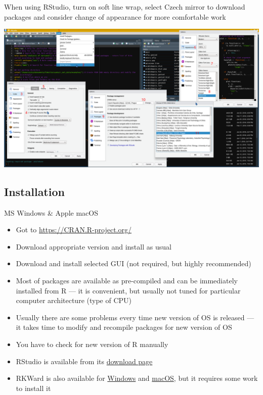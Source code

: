 \documentclass[compress, ucs, xelatex, 11pt, xcolor=svgnames,
	hyperref={
		bookmarks=true,
		unicode=true,
		colorlinks=true,
		pdftitle={Molecular data in R},
		plainpages=false,
		pdfauthor={Vojtech Zeisek},
		pdfsubject={Course about phylogeny and evolution in R},
		pdfcreator={XeLaTeX},
		pdfkeywords={R, evolution, phylogeny, molecular data},
		linkcolor=Tomato,
		anchorcolor=SaddleBrown,
		citecolor=Goldenrod,
		filecolor=DarkMagenta,
		menucolor=Sienna,
		urlcolor=DarkTurquoise,
		pdftex},
	url={hyphens, lowtilde} %
	]{beamer}
\begin{document}
\begin{frame}{When using RStudio, turn on soft line wrap, select Czech mirror to download packages and consider change of appearance for more comfortable work}
	\begin{center}
		\includegraphics[width=\textwidth-1.5cm]{rstudio_settings.png}
	\end{center}
\end{frame}

\subsection{Installation}

\begin{frame}{MS Windows \& Apple macOS}
	\begin{itemize}
		\item Got to \url{https://CRAN.R-project.org/}
		\item Download appropriate version and install as usual
		\item Download and install selected GUI (not required, but highly recommended)
		\item Most of packages are available as pre-compiled and can be immediately installed from R --- it is convenient, but usually not tuned for particular computer architecture (type of CPU)
		\item Usually there are some problems every time new version of OS is released --- it takes time to modify and recompile packages for new version of OS
		\item You have to check for new version of R manually
		\item RStudio is available from its \href{https://www.rstudio.com/products/rstudio/download/\#download}{download page}
		\item RKWard is also available for \href{https://rkward.kde.org/RKWard_on_Windows}{Windows} and \href{https://rkward.kde.org/RKWard_on_Mac}{macOS}, but it requires some work to install it
	\end{itemize}
\end{frame}
\end{document}

